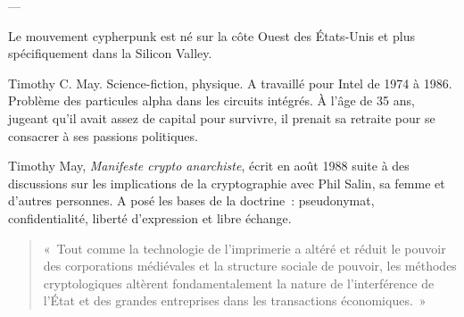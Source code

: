 ---


Le mouvement cypherpunk est né sur la côte Ouest des États-Unis et plus spécifiquement dans la Silicon Valley.

Timothy C. May. Science-fiction, physique. A travaillé pour Intel de 1974 à 1986. Problème des particules alpha dans les circuits intégrés. À l'âge de 35 ans, jugeant qu'il avait assez de capital pour survivre, il prenait sa retraite pour se consacrer à ses passions politiques. %



Timothy May, \emph{Manifeste crypto anarchiste}, écrit en août 1988 suite à des discussions sur les implications de la cryptographie avec Phil Salin, sa femme et d'autres personnes. A posé les bases de la doctrine~: pseudonymat, confidentialité, liberté d'expression et libre échange.

\begin{quote}
«~Tout comme la technologie de l'imprimerie a altéré et réduit le pouvoir des corporations médiévales et la structure sociale de pouvoir, les méthodes cryptologiques altèrent fondamentalement la nature de l'interférence de l'État et des grandes entreprises dans les transactions économiques.~»
\end{quote} %

